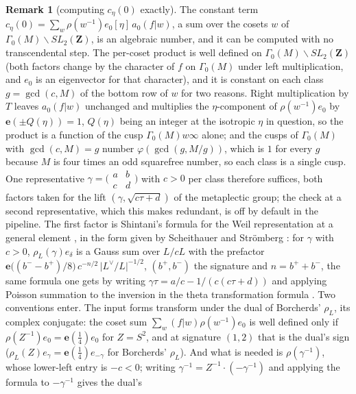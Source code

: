 \documentclass[11pt,reqno]{amsart}
\theoremstyle{plain}
\theoremstyle{definition}
\newtheorem{remark}[theorem]{Remark}
\newcommand{\Ldual}{L^{\vee}}
\begin{document}
\begin{remark}[computing $c_\eta(0)$ exactly]\label{rem:exact}
The constant term $c_\eta(0)=\sum_w\rho(w^{-1})e_0[\eta]\,a_0(f|w)$, a sum over the cosets $w$ of
$\Gamma_0(M)\backslash SL_2(\mathbf Z)$, is an algebraic number, and it can be computed with no
transcendental step. The per-coset product is well defined on $\Gamma_0(M)\backslash SL_2(\mathbf Z)$
(both factors change by the character of $f$ on $\Gamma_0(M)$ under left multiplication, and $e_0$ is
an eigenvector for that character), and it is constant on each class $g=\gcd(c,M)$ of the bottom row
of $w$ for two reasons. Right multiplication by $T$ leaves $a_0(f|w)$ unchanged and multiplies the
$\eta$-component of $\rho(w^{-1})e_0$ by $\mathbf e(\pm Q(\eta))=1$, $Q(\eta)$ being an integer at
the isotropic $\eta$ in question, so the product is a function of the cusp $\Gamma_0(M)w\infty$ alone;
and the cusps of $\Gamma_0(M)$ with $\gcd(c,M)=g$ number $\varphi(\gcd(g,M/g))$, which is $1$ for
every $g$ because $M$ is four times an odd squarefree number, so each class is a single cusp. One
representative $\gamma=\bigl(\begin{smallmatrix}a&b\\c&d\end{smallmatrix}\bigr)$ with $c>0$ per
class therefore suffices, both factors taken for the lift $(\gamma,\sqrt{c\tau+d})$ of the metaplectic
group; the check at a second representative, which this makes redundant, is off by default in the
pipeline. The first factor is Shintani's formula for the Weil representation at a general element
\cite[Prop.~1.6]{Shintani}, in the form given by Scheithauer \cite[Thm.~4.7]{Scheithauer} and
Str\"omberg \cite{Stromberg}: for $\gamma$ with $c>0$, $\rho_L(\gamma)e_\delta$ is a Gauss sum over
$L/cL$ with the prefactor $\mathbf e\bigl((b^--b^+)/8\bigr)\,c^{-n/2}\,\lvert\Ldual/L\rvert^{-1/2}$,
$(b^+,b^-)$ the signature and $n=b^++b^-$, the same formula one gets by writing
$\gamma\tau=a/c-1/(c(c\tau+d))$ and applying Poisson summation to the inversion in the theta
transformation formula \cite[Thm.~4.1]{Borcherds}. Two conventions enter. The input forms transform
under the dual of Borcherds' $\rho_L$, its complex conjugate: the coset sum $\sum_w(f|w)\rho(w^{-1})e_0$
is well defined only if $\rho(Z^{-1})e_0=\mathbf e(\tfrac14)e_0$ for $Z=S^2$, and at signature $(1,2)$
that is the dual's sign ($\rho_L(Z)e_\gamma=\mathbf e(\tfrac14)e_{-\gamma}$ for Borcherds' $\rho_L$).
And what is needed is $\rho(\gamma^{-1})$, whose lower-left entry is $-c<0$; writing
$\gamma^{-1}=Z^{-1}\cdot(-\gamma^{-1})$ and applying the formula to $-\gamma^{-1}$ gives the dual's

\end{remark}
\end{document}
